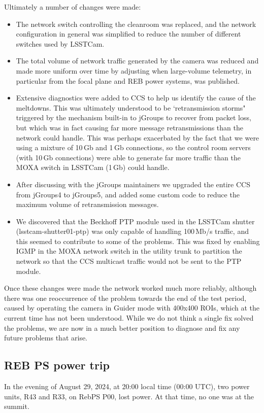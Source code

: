 Ultimately a number of changes were made:

\begin{itemize}
\item The network switch controlling the cleanroom was replaced, and the network configuration in general was simplified to reduce the number of different switches used by LSSTCam.
\item The total volume of network traffic generated by the camera was reduced and made more uniform over time by adjusting when large-volume telemetry, in particular from the focal plane and REB power systems, was published.
\item Extensive diagnostics were added to CCS to help us identify the cause of the meltdowns. This was ultimately understood to be `retransmission storms" triggered by the mechanism built-in to jGroups to recover from packet loss, but which was in fact causing far more message retransmissions than the network could handle. This was perhaps exacerbated by the fact that we were using a mixture of 10\,Gb and 1\,Gb connections, so the control room servers (with 10\,Gb connections) were able to generate far more traffic than the MOXA switch in LSSTCam (1\,Gb) could handle.
\item After discussing with the jGroups maintainers we upgraded the entire CCS from jGroups4 to jGroups5, and added some custom code to reduce the maximum volume of retransmission messages.
\item We discovered that the Beckhoff PTP module used in the LSSTCam shutter (lsstcam-shutter01-ptp) was only capable of handling 100\,Mb/s traffic, and this seemed to contribute to some of the problems. This was fixed by enabling IGMP in the MOXA network switch in the utility trunk to partition the network so that the CCS multicast traffic would not be sent to the PTP module.
\end{itemize}

Once these changes were made the network worked much more reliably, although there was one reoccurrence of the problem towards the end of the test period, caused by operating the camera in Guider mode with 400x400 ROIs, which at the current time has not been understood. While we do not think a single fix solved the problems, we are now in a much better position to diagnose and fix any future problems that arise.

\clearpage
\subsection{REB PS power trip}\label{sec:rebpstripped}
In the evening of August 29, 2024, at 20:00 local time (00:00 UTC), two power units, R43 and R33, on RebPS P00, lost power. At that time, no one was at the summit.

